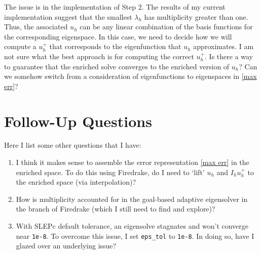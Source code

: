 \documentclass[12pt,a4paper]{article}
\theoremstyle{boldthm}
\theoremstyle{bolddefn}
\begin{document}
The issue is in the implementation of Step 2. The results of my current implementation suggest that the smallest $\lambda_h$ has multiplicity greater than one. Thus, the associated $u_h$ can be any linear combination of the basis functions for the corresponding eigenspace. In this case, we need to decide how we will compute a $u_h^+$ that corresponds to the eigenfunction that $u_h$ approximates. I am not sure what the best approach is for computing the correct $u_h^+.$ Is there a way to guarantee that the enriched solve converges to the enriched version of $u_h$? Can we somehow switch from a consideration of eigenfunctions to eigenspaces in \eqref{max err}?

\section{Follow-Up Questions}

Here I list some other questions that I have:

\begin{enumerate}
    \item I think it makes sense to assemble the error representation \eqref{max err} in the enriched space. To do this using Firedrake, do I need to `lift' $u_h$ and $I_h u_h^+$ to the enriched space (via interpolation)?
    \item How is multiplicity accounted for in the goal-based adaptive eigensolver in the branch of Firedrake (which I still need to find and explore)? 
    \item With SLEPc default tolerance, an eigensolve stagnates and won't converge near \texttt{1e-8}. To overcome this issue, I set \texttt{eps\_tol} to \texttt{1e-8}. In doing so, have I glazed over an underlying issue? 
\end{enumerate}
\end{document}
